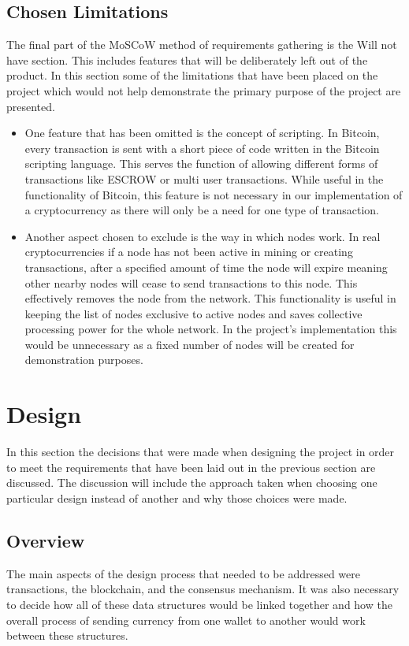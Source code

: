 \documentclass{l4proj}
\begin{document}
\section{Chosen Limitations}
The final part of the MoSCoW method of requirements gathering is the Will not have section. This includes features that will be 
deliberately left out of the product.
In this section some of the limitations that have been placed on the project which would not help demonstrate the 
primary purpose of the project are presented.
\begin{itemize}
    \item One feature that has been omitted is the concept of scripting. In Bitcoin, every transaction is sent
        with a short piece of code written in the Bitcoin scripting language. This serves the function of allowing 
        different forms of transactions like ESCROW or multi user transactions. While useful in the functionality of
        Bitcoin, this feature is not necessary in our implementation of a cryptocurrency as there will only be a need
        for one type of transaction.
    \item Another aspect chosen to exclude is the way in which nodes work. In real cryptocurrencies if a node
        has not been active in mining or creating transactions, after a specified amount of time the node will expire
        meaning other nearby nodes will cease to send transactions to this node. This effectively removes the node from
        the network. This functionality is useful in keeping the list of nodes exclusive to active nodes and saves
        collective processing power for the whole network. In the project's implementation this would be unnecessary as a fixed
        number of nodes will be created for demonstration purposes.
\end{itemize}

\chapter{Design}
In this section the decisions that were made when designing the project in order to meet the requirements
that have been laid out in the previous section are discussed. The discussion will include the approach taken when
choosing one particular design instead of another and why those choices were made.

\section{Overview}
The main aspects of the design process that needed to be addressed were transactions, the blockchain, and
the consensus mechanism. It was also necessary to decide how all of these data structures would be linked together and
how the overall process of sending currency from one wallet to another would work between these structures.
\end{document}
